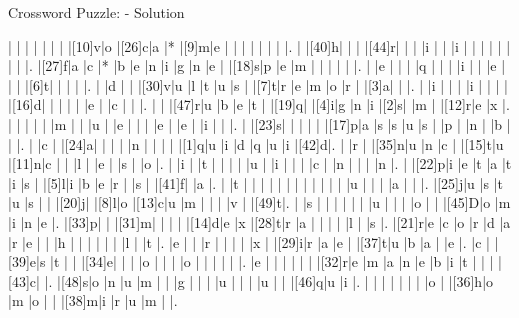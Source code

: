\documentclass[12pt]{article}
\begin{document}
\begin{center}
  \huge{Crossword Puzzle: - Solution}
\end{center}
\vspace{1.5cm}
\PuzzleSolution
\begin{Puzzle}{22}{24}
  |{}  |{}  |{}  |{}  |{}  |{}  |{}  |[10]v|o   |[26]c|a   |*   |[9]m|e   |{}  |{}  |{}  |{}  |{}  |{}  |{}  |.
  |{}  |[40]h|{}  |{}  |{}  |[44]r|{}  |{}  |{}  |i   |{}  |{}  |i   |{}  |{}  |{}  |{}  |{}  |{}  |{}  |{}  |.
  |[27]f|a   |c   |*   |b   |e   |n   |i   |g   |n   |e   |{}  |[18]s|p   |e   |m   |{}  |{}  |{}  |{}  |{}  |.
  |{}  |e   |{}  |{}  |{}  |q   |{}  |{}  |{}  |i   |{}  |{}  |e   |{}  |{}  |{}  |[6]t|{}  |{}  |{}  |{}  |.
  |{}  |d   |{}  |{}  |[30]v|u   |l   |t   |u   |s   |{}  |[7]t|r   |e   |m   |o   |r   |{}  |[3]a|{}  |{}  |.
  |{}  |i   |{}  |{}  |{}  |i   |{}  |{}  |{}  |{}  |[16]d|{}  |{}  |{}  |{}  |{}  |e   |{}  |c   |{}  |{}  |.
  |{}  |{}  |[47]r|u   |b   |e   |t   |{}  |[19]q|{}  |[4]i|g   |n   |i   |[2]s|{}  |m   |{}  |[12]r|e   |x   |.
  |{}  |{}  |{}  |{}  |{}  |m   |{}  |{}  |u   |{}  |e   |{}  |{}  |{}  |e   |{}  |e   |{}  |i   |{}  |{}  |.
  |{}  |[23]s|{}  |{}  |{}  |{}  |{}  |[17]p|a   |s   |s   |u   |s   |{}  |p   |{}  |n   |{}  |b   |{}  |{}  |.
  |{}  |c   |{}  |[24]a|{}  |{}  |{}  |{}  |n   |{}  |{}  |{}  |{}  |[1]q|u   |i   |d   |q   |u   |i   |[42]d|.
  |{}  |r   |{}  |[35]n|u   |n   |c   |{}  |[15]t|u   |[11]n|c   |{}  |{}  |l   |{}  |e   |{}  |s   |{}  |o   |.
  |{}  |i   |{}  |t   |{}  |{}  |{}  |{}  |u   |{}  |i   |{}  |{}  |{}  |c   |{}  |n   |{}  |{}  |{}  |n   |.
  |{}  |[22]p|i   |e   |t   |a   |t   |i   |s   |{}  |[5]l|i   |b   |e   |r   |{}  |s   |{}  |[41]f|{}  |a   |.
  |{}  |t   |{}  |{}  |{}  |{}  |{}  |{}  |{}  |{}  |{}  |{}  |{}  |{}  |u   |{}  |{}  |{}  |a   |{}  |{}  |.
  |[25]j|u   |s   |t   |u   |s   |{}  |{}  |[20]j|{}  |[8]l|o   |[13]c|u   |m   |{}  |{}  |{}  |v   |{}  |[49]t|.
  |{}  |s   |{}  |{}  |{}  |{}  |{}  |{}  |u   |{}  |{}  |{}  |o   |{}  |{}  |[45]D|o   |m   |i   |n   |e   |.
  |[33]p|{}  |{}  |[31]m|{}  |{}  |{}  |{}  |[14]d|e   |x   |[28]t|r   |a   |{}  |{}  |{}  |{}  |l   |{}  |s   |.
  |[21]r|e   |c   |o   |r   |d   |a   |r   |e   |{}  |{}  |h   |{}  |{}  |{}  |{}  |{}  |{}  |l   |{}  |t   |.
  |e   |{}  |{}  |r   |{}  |{}  |{}  |{}  |x   |{}  |[29]i|r   |a   |e   |{}  |[37]t|u   |b   |a   |{}  |e   |.
  |c   |{}  |[39]e|s   |t   |{}  |{}  |[34]e|{}  |{}  |{}  |o   |{}  |{}  |{}  |o   |{}  |{}  |{}  |{}  |{}  |.
  |e   |{}  |{}  |{}  |{}  |{}  |{}  |[32]r|e   |m   |a   |n   |e   |b   |i   |t   |{}  |{}  |{}  |[43]c|{}  |.
  |[48]s|o   |n   |u   |m   |{}  |{}  |g   |{}  |{}  |{}  |u   |{}  |{}  |{}  |u   |{}  |{}  |[46]q|u   |i   |.
  |{}  |{}  |{}  |{}  |{}  |{}  |{}  |o   |{}  |[36]h|o   |m   |o   |{}  |{}  |[38]m|i   |r   |u   |m   |{}  |.
\end{Puzzle}
\end{document}
